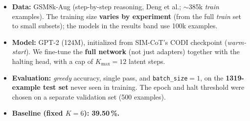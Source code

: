 \documentclass[portrait,a0paper,fontscale=0.31]{baposter} %
\newcommand{\compresslist}{ %
\setlength{\itemsep}{1pt}
\setlength{\parskip}{0pt}
\setlength{\parsep}{0pt}
}
\begin{document}
\begin{poster}
{\begin{itemize}[left=0.45em, rightmargin=0.6em]\compresslist
  \item \textbf{Data:} GSM8k-Aug (step-by-step reasoning, Deng et al.; $\sim$385k \emph{train} examples). The training size \textbf{varies by experiment} (from the full \emph{train} set to small subsets); the models in the results band use 100k examples.
  \item \textbf{Model:} GPT-2 (124M), initialized from SIM-CoT's CODI checkpoint (\emph{warm-start}). We fine-tune the \textbf{full network} (not just adapters) together with the halting head, with a cap of $K_{\max}{=}12$ latent steps.
  \item \textbf{Evaluation:} \emph{greedy} accuracy, single pass, and \texttt{batch\_size}$=1$, on the \textbf{1319-example test set} never seen in training. The epoch and halt threshold were chosen on a separate validation set (500 examples).
  \item \textbf{Baseline (fixed $K=6$): 39.50\,\%.}
\end{itemize}
}

\end{poster}
\end{document}
